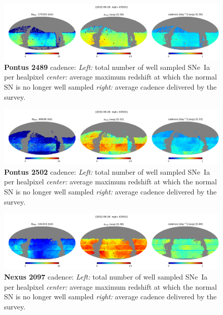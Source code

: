 \begin{figure}[h!]
  \begin{center}
    \includegraphics[width=\linewidth]{Figures/pontus_2489_64_maps.png}
    \caption{{\bf Pontus 2489} cadence: {\em Left:} total number of well
      sampled SNe~Ia per healpixel {\em center:} average maximum
      redshift at which the normal SN is no longer well sampled {\em
        right:} average cadence delivered by the survey.}
  \end{center}
\end{figure}

\begin{figure}[h!]
  \begin{center}
    \includegraphics[width=\linewidth]{Figures/pontus_2502_64_maps.png}
    \caption{{\bf Pontus 2502} cadence: {\em Left:} total number of well
      sampled SNe~Ia per healpixel {\em center:} average maximum
      redshift at which the normal SN is no longer well sampled {\em
        right:} average cadence delivered by the survey.}
  \end{center}
\end{figure}

\begin{figure}[h!]
  \begin{center}
    \includegraphics[width=\linewidth]{Figures/nexus_2097_64_maps.png}
    \caption{{\bf Nexus 2097} cadence: {\em Left:} total number of well
      sampled SNe~Ia per healpixel {\em center:} average maximum
      redshift at which the normal SN is no longer well sampled {\em
        right:} average cadence delivered by the survey.}
  \end{center}
\end{figure}


